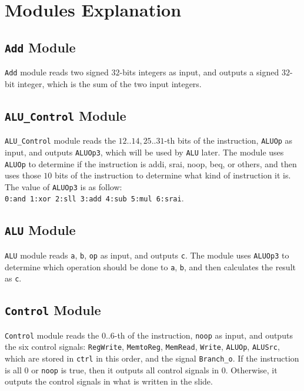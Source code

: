 \section{Modules Explanation}

\subsection{\texttt{Add} Module}

\texttt{Add} module reads two signed $32$-bits integers as input, and outputs a signed $32$-bit integer, which is the sum of the two input integers.

\subsection{\texttt{ALU\_Control} Module}

\texttt{ALU\_Control} module reads the $12..14, 25..31$-th bits of the instruction, \texttt{ALUOp} as input, and outputs \texttt{ALUOp3}, which will be used by \texttt{ALU} later. The module uses \texttt{ALUOp} to determine if the instruction is addi, srai, noop, beq, or others, and then uses those $10$ bits of the instruction to determine what kind of instruction it is. The value of \texttt{ALUOp3} is as follow:\\
\texttt{0:and 1:xor 2:sll 3:add 4:sub 5:mul 6:srai}.

\subsection{\texttt{ALU} Module}

\texttt{ALU} module reads \texttt{a}, \texttt{b}, \texttt{op} as input, and outputs \texttt{c}. The module uses \texttt{ALUOp3} to determine which operation should be done to \texttt{a}, \texttt{b}, and then calculates the result as \texttt{c}.

\subsection{\texttt{Control} Module}

\texttt{Control} module reads the $0..6$-th of the instruction, \texttt{noop} as input, and outputs the six control signals: \texttt{RegWrite}, \texttt{MemtoReg}, \texttt{MemRead}, \texttt{Write}, \texttt{ALUOp}, \texttt{ALUSrc}, which are stored in \texttt{ctrl} in this order, and the signal \texttt{Branch\_o}. If the instruction is all $0$ or \texttt{noop} is true, then it outputs all control signals in $0$. Otherwise, it outputs the control signals in what is written in the slide.

